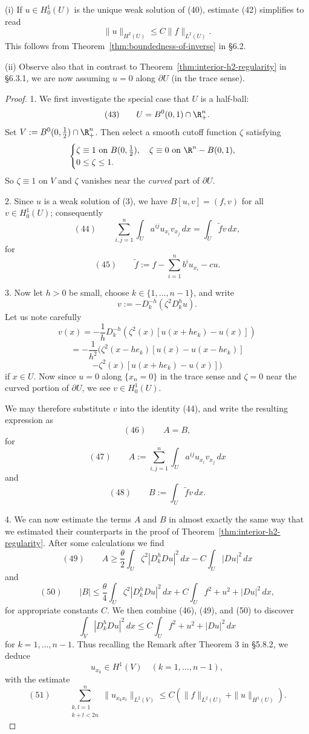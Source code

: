 \begin{remark}
\label{rem:boundary-regularity-remarks}
(i) If $u \in H_0^1(U)$ is the unique weak solution of (40), estimate (42) simplifies to read
$$\|u\|_{H^2(U)} \leq C\|f\|_{L^2(U)}.$$
This follows from Theorem~\ref{thm:boundedness-of-inverse} in \S6.2.

(ii) Observe also that in contrast to Theorem~\ref{thm:interior-h2-regularity} in \S6.3.1, we are now assuming $u = 0$ along $\partial U$ (in the trace sense).
\end{remark}

\begin{proof}
1. We first investigate the special case that $U$ is a half-ball:
$$(43) \qquad U = B^0(0,1) \cap \R^n_+.$$
Set $V := B^0(0,\frac12) \cap \R^n_+$. Then select a smooth cutoff function $\zeta$ satisfying
$$\begin{cases} \zeta \equiv 1 \text{ on } B(0,\frac12), \quad \zeta \equiv 0 \text{ on } \R^n - B(0,1), \\ 0 \leq \zeta \leq 1. \end{cases}$$
So $\zeta \equiv 1$ on $V$ and $\zeta$ vanishes near the \textit{curved} part of $\partial U$.

2. Since $u$ is a weak solution of (3), we have $B[u,v] = (f,v)$ for all $v \in H_0^1(U)$; consequently
$$(44) \qquad \sum_{i,j=1}^n \int_U a^{ij}u_{x_i}v_{x_j}\,dx = \int_U \tilde f v\,dx,$$
for
$$(45) \qquad \tilde f := f - \sum_{i=1}^n b^iu_{x_i} - cu.$$

3. Now let $h > 0$ be small, choose $k \in \{1,\ldots,n-1\}$, and write
$$v := -D_k^{-h}(\zeta^2D_k^hu).$$
Let us note carefully
$$v(x) = -\frac1hD_k^{-h}(\zeta^2(x)[u(x+he_k)-u(x)])$$
$$= -\frac1{h^2}(\zeta^2(x-he_k)[u(x)-u(x-he_k)]$$
$$- \zeta^2(x)[u(x+he_k)-u(x)])$$
if $x \in U$. Now since $u = 0$ along $\{x_n = 0\}$ in the trace sense and $\zeta = 0$ near the curved portion of $\partial U$, we see $v \in H_0^1(U)$.

We may therefore substitute $v$ into the identity (44), and write the resulting expression as
$$(46) \qquad A = B,$$
for
$$(47) \qquad A := \sum_{i,j=1}^n \int_U a^{ij}u_{x_i}v_{x_j}\,dx$$
and
$$(48) \qquad B := \int_U \tilde f v\,dx.$$

4. We can now estimate the terms $A$ and $B$ in almost exactly the same way that we estimated their counterparts in the proof of Theorem~\ref{thm:interior-h2-regularity}. After some calculations we find
$$(49) \qquad A \geq \frac\theta2\int_U \zeta^2|D_k^hDu|^2\,dx - C\int_U|Du|^2\,dx$$
and
$$(50) \qquad |B| \leq \frac\theta4\int_U \zeta^2|D_k^hDu|^2\,dx + C\int_U f^2+u^2+|Du|^2\,dx,$$
for appropriate constants $C$. We then combine (46), (49), and (50) to discover
$$\int_V|D_k^hDu|^2\,dx \leq C\int_U f^2+u^2+|Du|^2\,dx$$
for $k = 1,\ldots,n-1$. Thus recalling the Remark after Theorem 3 in \S5.8.2, we deduce
$$u_{x_k} \in H^1(V) \quad (k=1,\ldots,n-1),$$
with the estimate
$$(51) \qquad \sum_{\substack{k,l=1 \\ k+l<2n}}^n \|u_{x_kx_l}\|_{L^2(V)} \leq C(\|f\|_{L^2(U)}+\|u\|_{H^1(U)}).$$


\end{proof}
